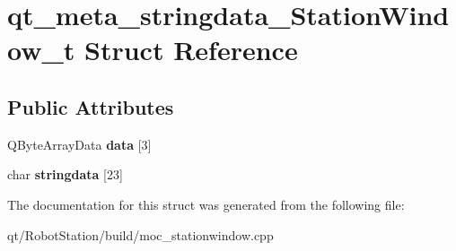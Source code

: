 \hypertarget{structqt__meta__stringdata__StationWindow__t}{}\section{qt\+\_\+meta\+\_\+stringdata\+\_\+\+Station\+Window\+\_\+t Struct Reference}
\label{structqt__meta__stringdata__StationWindow__t}
\subsection*{Public Attributes}
\begin{DoxyCompactItemize}
\item 
\hypertarget{structqt__meta__stringdata__StationWindow__t_a40b573beb4c5e16332f1125ffffde599}{}Q\+Byte\+Array\+Data {\bfseries data} \mbox{[}3\mbox{]}\label{structqt__meta__stringdata__StationWindow__t_a40b573beb4c5e16332f1125ffffde599}

\item 
\hypertarget{structqt__meta__stringdata__StationWindow__t_ae56730a798775af7e3e3e1c248988b8b}{}char {\bfseries stringdata} \mbox{[}23\mbox{]}\label{structqt__meta__stringdata__StationWindow__t_ae56730a798775af7e3e3e1c248988b8b}

\end{DoxyCompactItemize}


The documentation for this struct was generated from the following file\+:\begin{DoxyCompactItemize}
\item 
qt/\+Robot\+Station/build/moc\+\_\+stationwindow.\+cpp\end{DoxyCompactItemize}
